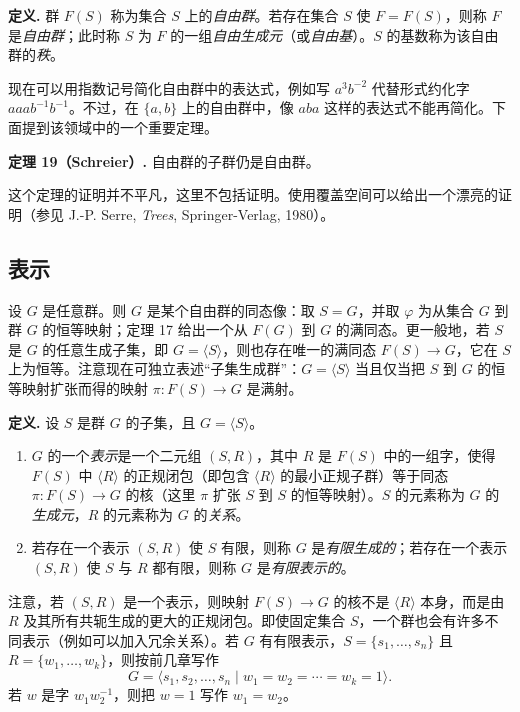 \medskip
\noindent\textbf{定义.} 群 $F(S)$ 称为集合 $S$ 上的\emph{自由群}。若存在集合 $S$ 使 $F=F(S)$，则称 $F$ 是\emph{自由群}；此时称 $S$ 为 $F$ 的一组\emph{自由生成元}（或\emph{自由基}）。$S$ 的基数称为该自由群的\emph{秩}。

现在可以用指数记号简化自由群中的表达式，例如写 $a^3b^{-2}$ 代替形式约化字 $aaab^{-1}b^{-1}$。不过，在 $\{a,b\}$ 上的自由群中，像 $aba$ 这样的表达式不能再简化。下面提到该领域中的一个重要定理。

\medskip
\noindent\textbf{定理 19（Schreier）.} 自由群的子群仍是自由群。

这个定理的证明并不平凡，这里不包括证明。使用覆盖空间可以给出一个漂亮的证明（参见 J.-P. Serre, \emph{Trees}, Springer-Verlag, 1980）。

\subsection*{表示}

设 $G$ 是任意群。则 $G$ 是某个自由群的同态像：取 $S=G$，并取 $\varphi$ 为从集合 $G$ 到群 $G$ 的恒等映射；定理 17 给出一个从 $F(G)$ 到 $G$ 的满同态。更一般地，若 $S$ 是 $G$ 的任意生成子集，即 $G=\langle S\rangle$，则也存在唯一的满同态 $F(S)\to G$，它在 $S$ 上为恒等。注意现在可独立表述“子集生成群”：$G=\langle S\rangle$ 当且仅当把 $S$ 到 $G$ 的恒等映射扩张而得的映射 $\pi:F(S)\to G$ 是满射。

\medskip
\noindent\textbf{定义.} 设 $S$ 是群 $G$ 的子集，且 $G=\langle S\rangle$。
\begin{enumerate}[label=(\arabic*)]
  \item $G$ 的一个\emph{表示}是一个二元组 $(S,R)$，其中 $R$ 是 $F(S)$ 中的一组字，使得 $F(S)$ 中 $\langle R\rangle$ 的正规闭包（即包含 $\langle R\rangle$ 的最小正规子群）等于同态 $\pi:F(S)\to G$ 的核（这里 $\pi$ 扩张 $S$ 到 $S$ 的恒等映射）。$S$ 的元素称为 $G$ 的\emph{生成元}，$R$ 的元素称为 $G$ 的\emph{关系}。
  \item 若存在一个表示 $(S,R)$ 使 $S$ 有限，则称 $G$ 是\emph{有限生成的}；若存在一个表示 $(S,R)$ 使 $S$ 与 $R$ 都有限，则称 $G$ 是\emph{有限表示的}。
\end{enumerate}

注意，若 $(S,R)$ 是一个表示，则映射 $F(S)\to G$ 的核不是 $\langle R\rangle$ 本身，而是由 $R$ 及其所有共轭生成的更大的正规闭包。即使固定集合 $S$，一个群也会有许多不同表示（例如可以加入冗余关系）。若 $G$ 有有限表示，$S=\{s_1,
\ldots,s_n\}$ 且 $R=\{w_1,
\ldots,w_k\}$，则按前几章写作
\[
  G=\langle s_1,s_2,\ldots,s_n\mid w_1=w_2=\cdots=w_k=1\rangle.
\]
若 $w$ 是字 $w_1w_2^{-1}$，则把 $w=1$ 写作 $w_1=w_2$。

